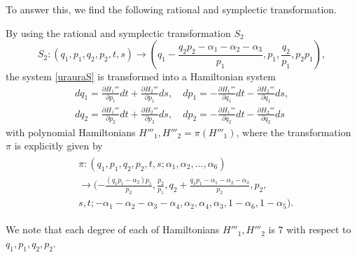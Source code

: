 To answer this, we find the following rational and symplectic transformation.
\begin{thm}\label{th:inininoka}
By using the rational and symplectic transformation $S_2$
\begin{equation}
S_2:(q_1,p_1,q_2,p_2,t,s) \rightarrow \left(q_1-\frac{q_2p_2-\alpha_1-\alpha_2-\alpha_3}{p_1},p_1,\frac{q_2}{p_1},p_2p_1\right),
\end{equation}
the system \eqref{urauraS} is transformed into a Hamiltonian system
\begin{equation}\label{uraurauraS}
\begin{aligned}
dq_1=\frac{\partial H_1'''}{\partial p_1}dt+\frac{\partial H_2'''}{\partial p_1}ds, \quad dp_1=-\frac{\partial H_1'''}{\partial q_1}dt-\frac{\partial H_2'''}{\partial q_1}ds,\\
dq_2=\frac{\partial H_1'''}{\partial p_2}dt+\frac{\partial H_2'''}{\partial p_2}ds, \quad dp_2=-\frac{\partial H_1'''}{\partial q_2}dt-\frac{\partial H_2'''}{\partial q_2}ds
\end{aligned}
\end{equation}
with polynomial Hamiltonians $H'''_1,H'''_2=\pi(H'''_1)$, where the transformation $\pi$ is explicitly given by
\begin{align}
\begin{split}
&\pi:(q_1,p_1,q_2,p_2,t,s;\alpha_1,\alpha_2, \dots ,\alpha_6)\\
&\rightarrow (-\frac{(q_1p_1-\alpha_2)p_1}{p_2},\frac{p_2}{p_1},q_2+\frac{q_1p_1-\alpha_1-\alpha_2-\alpha_3}{p_2},p_2,\\
&s,t;-\alpha_1-\alpha_2-\alpha_3-\alpha_4,\alpha_2,\alpha_4,\alpha_3,1-\alpha_6,1-\alpha_5 ).
\end{split}
\end{align}
\end{thm}
We note that each degree of each of Hamiltonians $H'''_1,H'''_2$ is 7 with respect to $q_1,p_1,q_2,p_2$.



